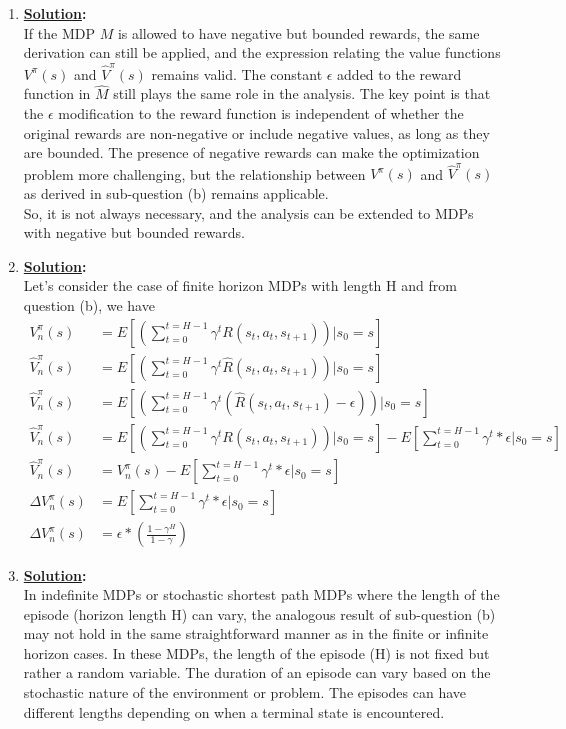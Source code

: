 \documentclass[12pt]{article}
\newcommand{\solution}{\noindent \textbf{\underline{Solution}: }}
\begin{document}
\begin{enumerate}
    \item \solution \\
    If the MDP $M$ is allowed to have negative but bounded rewards, the same derivation can still be applied, and the expression relating the value functions $V^\pi(s)$ and $\hat{V}^\pi(s)$ remains valid. The constant $\epsilon$ added to the reward function in $\hat{M}$ still plays the same role in the analysis.
    The key point is that the $\epsilon$ modification to the reward function is independent of whether the original rewards are non-negative or include negative values, as long as they are bounded. The presence of negative rewards can make the optimization problem more challenging, but the 
    relationship between $V^\pi(s)$ and $\hat{V}^\pi(s)$ as derived in sub-question (b) remains applicable. \\
    So, it is not always necessary, and the analysis can be extended to MDPs with negative but bounded rewards.
    
    \item \solution \\
    Let's consider the case of finite horizon MDPs with length H and from question (b), we have
    \begin{align*}
        V_n ^\pi(s) &= E\left[ \left(\sum_{t=0} ^{t=H-1} \gamma^t R(s_t, a_t, s_{t+1})\right) | s_0 = s \right] \\
        \hat{V}_n ^\pi(s) &= E\left[ \left(\sum_{t=0} ^{t=H-1} \gamma^t \hat{R}(s_t, a_t, s_{t+1})\right) | s_0 = s \right] \\
        \hat{V}_n ^\pi(s) &= E\left[ \left(\sum_{t=0} ^{t=H-1} \gamma^t (\hat{R}(s_t, a_t, s_{t+1}) - \epsilon)\right) | s_0 = s \right] \\
        \hat{V}_n ^\pi(s) &= E\left[ \left(\sum_{t=0} ^{t=H-1} \gamma^t R(s_t, a_t, s_{t+1})\right) | s_0 = s \right] - E\left[\sum_{t=0} ^{t=H-1} \gamma^t * \epsilon | s_0 = s\right] \\
        \hat{V}_n ^\pi(s) &= V_n ^\pi(s) - E\left[\sum_{t=0} ^{t=H-1} \gamma^t * \epsilon | s_0 = s\right] \\
        \Delta V_n ^\pi(s) &= E\left[\sum_{t=0} ^{t=H-1} \gamma^t * \epsilon | s_0 = s\right] \\
        \Delta V_n ^\pi(s) &= \epsilon * \left(\frac{1 - \gamma ^ {H}}{1 - \gamma} \right) 
    \end{align*}

    \item \solution \\
    In indefinite MDPs or stochastic shortest path MDPs where the length of the episode 
    (horizon length H) can vary, the analogous result of sub-question (b) may not hold in the same 
    straightforward manner as in the finite or infinite horizon cases.
    In these MDPs, the length of the episode (H) is not fixed but rather a random variable. 
    The duration of an episode can vary based on the stochastic nature of the environment or problem.
    The episodes can have different lengths depending on when a terminal state is encountered.


\end{enumerate}
\end{document}

